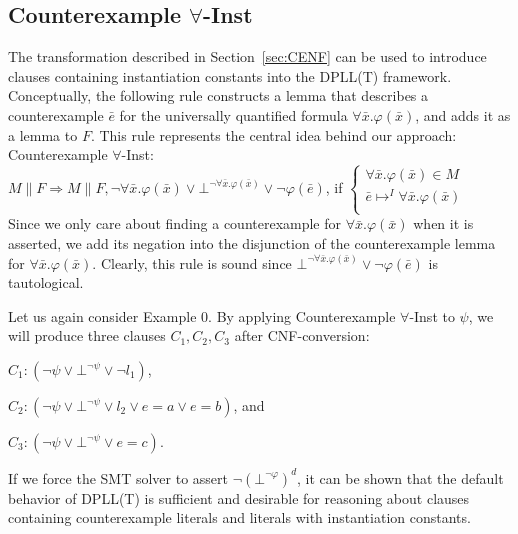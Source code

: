 \documentclass{llncs}
\begin{document}
\subsection{Counterexample $\forall$-Inst}

The transformation described in Section~\ref{sec:CENF} can be used to introduce clauses containing instantiation constants into the DPLL(T) framework.
Conceptually, the following rule constructs a lemma that describes a counterexample $\bar{e}$ for the universally quantified formula $\forall \bar{x}. \varphi( \bar{ x } )$, and adds it as a lemma to $F$.
This rule represents the central idea behind our approach: \\

\noindent Counterexample $\forall$-Inst: \\

$M \parallel F \Longrightarrow M \parallel F, \neg \forall \bar{x}. \varphi( \bar{x} ) \vee \bot^{\neg \forall \bar{x}. \varphi( \bar{x} )} \vee \neg \varphi( \bar{ e } )$, if   
$\begin{cases}
  \forall \bar{x}. \varphi( \bar{ x } ) \in M \\
  \bar{ e } \mapsto^I \forall \bar{x}. \varphi( \bar{ x } ) \\
\end{cases}$ \\

Since we only care about finding a counterexample for $\forall \bar{x}. \varphi( \bar{x} )$ when it is asserted, we add its negation into the disjunction of the counterexample lemma for $\forall \bar{x}. \varphi( \bar{x} )$.
Clearly, this rule is sound since $\bot^{\neg \forall \bar{x}. \varphi( \bar{x} )} \vee \neg \varphi( \bar{ e } )$ is tautological.

Let us again consider Example 0.
By applying Counterexample $\forall$-Inst to $\psi$, we will produce three clauses $C_1, C_2, C_3$ after CNF-conversion:

$C_1 : ( \neg \psi \vee \bot^{\neg \psi} \vee \neg l_1)$,

$C_2 : ( \neg \psi \vee \bot^{\neg \psi} \vee l_2 \vee e = a \vee e = b )$, and

$C_3 : ( \neg \psi \vee \bot^{\neg \psi} \vee e = c )$.

If we force the SMT solver to assert $\neg( \bot^{\neg \varphi} )^d$, it can be shown that the default behavior of DPLL(T) is sufficient and desirable for reasoning about clauses containing counterexample literals and literals with instantiation constants.
\end{document}
